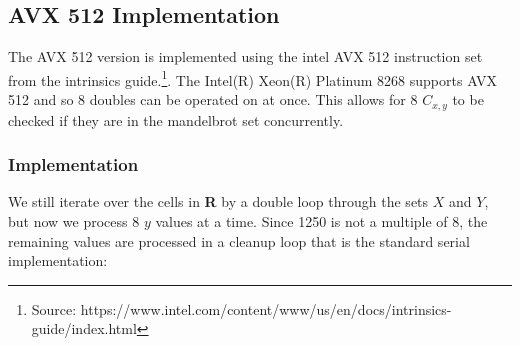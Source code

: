 \documentclass{article}
\begin{document}
\subsection{AVX 512 Implementation}
The AVX 512 version is implemented using the intel AVX 512 instruction set from the 
intrinsics guide.\footnote{Source: https://www.intel.com/content/www/us/en/docs/intrinsics-guide/index.html}. 
The Intel(R) Xeon(R) Platinum 8268 supports AVX 512 and so 8 doubles can be operated on at once. This allows for 
8 $C_{x,y}$ to be checked if they are in the mandelbrot set concurrently.

\subsubsection{Implementation}
We still iterate over the cells in \textbf{R} by a double loop through the sets 
$X$ and $Y$, but now we process 8 $y$ values at a time. Since 1250 is not a multiple of 8, the remaining 
values are processed in a cleanup loop that is the standard serial implementation:
\newpage
\end{document}
